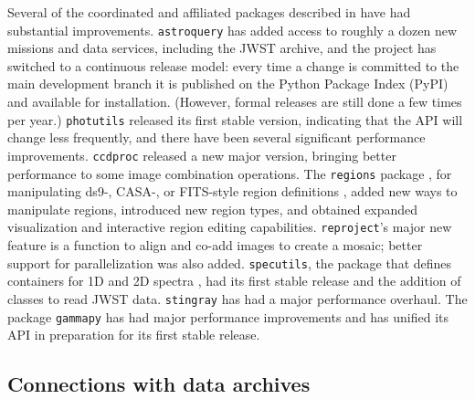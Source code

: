 \documentclass[modern]{aastex631}
\newcommand{\secauthor}[1]{{\color{blue}Author:~\textit{#1}}}
\begin{document}
Several of the coordinated and affiliated packages described in
\cite{astropy:2018} have had substantial improvements. \texttt{astroquery}
\citep{astroquery} has added access to roughly a dozen new missions and data
services, including the JWST archive, and the
project has switched to a continuous release model: every time a change is
committed to the main development branch it is published on the Python Package
Index (PyPI) and available for installation. (However, formal releases are still
done a few times per year.) \texttt{photutils} \citep{photutils} released its
first stable version, indicating that the API will change less frequently, and
there have been several significant performance improvements. \texttt{ccdproc}
\citep{ccdproc}  released a new major version, bringing better performance to
some image combination operations. The \texttt{regions} package
\citep{regions}, for manipulating ds9-, CASA-, or FITS-style region definitions \citep{ds9},
added new ways to manipulate regions, introduced new region types, and obtained
expanded visualization and interactive region editing capabilities.
\texttt{reproject}'s \citep{reproject} major new feature is a function to align
and co-add images to create a mosaic; better support for parallelization was
also added. \texttt{specutils}, the package that defines containers for 1D and
2D spectra \citep{specutils},  had its first stable release and the addition
of classes to read JWST data. \texttt{stingray} has had a major performance
overhaul. The package \texttt{gammapy} \citep{gammapy} has had major performance
improvements and has unified its API in preparation for its first stable
release.

\subsection{Connections with data archives}
\label{sec:astroquery}

\end{document}
